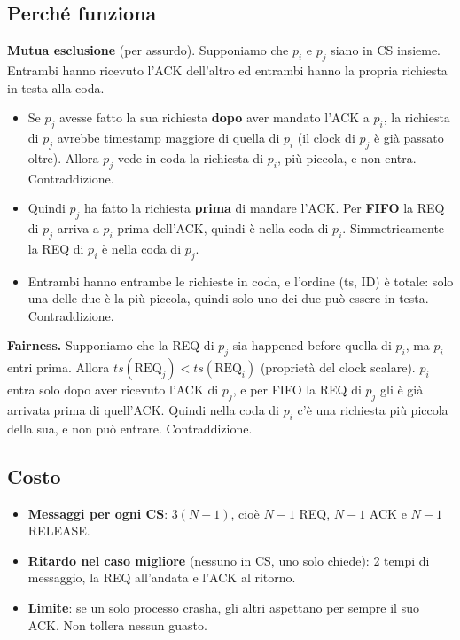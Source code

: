 \subsection{Perché funziona}

\textbf{Mutua esclusione} (per assurdo). Supponiamo che \(p_i\) e \(p_j\) siano in CS insieme. Entrambi hanno ricevuto l'ACK dell'altro ed entrambi hanno la propria richiesta in testa alla coda.

\begin{itemize}
\tightlist
\item
  Se \(p_j\) avesse fatto la sua richiesta \textbf{dopo} aver mandato l'ACK a \(p_i\), la richiesta di \(p_j\) avrebbe timestamp maggiore di quella di \(p_i\) (il clock di \(p_j\) è già passato oltre). Allora \(p_j\) vede in coda la richiesta di \(p_i\), più piccola, e non entra. Contraddizione.
\item
  Quindi \(p_j\) ha fatto la richiesta \textbf{prima} di mandare l'ACK. Per \textbf{FIFO} la REQ di \(p_j\) arriva a \(p_i\) prima dell'ACK, quindi è nella coda di \(p_i\). Simmetricamente la REQ di \(p_i\) è nella coda di \(p_j\).
\item
  Entrambi hanno entrambe le richieste in coda, e l'ordine (ts, ID) è totale: solo una delle due è la più piccola, quindi solo uno dei due può essere in testa. Contraddizione.
\end{itemize}

\textbf{Fairness.} Supponiamo che la REQ di \(p_j\) sia happened-before quella di \(p_i\), ma \(p_i\) entri prima. Allora \(ts(\text{REQ}_j) < ts(\text{REQ}_i)\) (proprietà del clock scalare). \(p_i\) entra solo dopo aver ricevuto l'ACK di \(p_j\), e per FIFO la REQ di \(p_j\) gli è già arrivata prima di quell'ACK. Quindi nella coda di \(p_i\) c'è una richiesta più piccola della sua, e non può entrare. Contraddizione.

\subsection{Costo}

\begin{itemize}
\tightlist
\item
  \textbf{Messaggi per ogni CS}: \(3(N-1)\), cioè \(N-1\) REQ, \(N-1\) ACK e \(N-1\) RELEASE.
\item
  \textbf{Ritardo nel caso migliore} (nessuno in CS, uno solo chiede): 2 tempi di messaggio, la REQ all'andata e l'ACK al ritorno.
\item
  \textbf{Limite}: se un solo processo crasha, gli altri aspettano per sempre il suo ACK. Non tollera nessun guasto.
\end{itemize}

